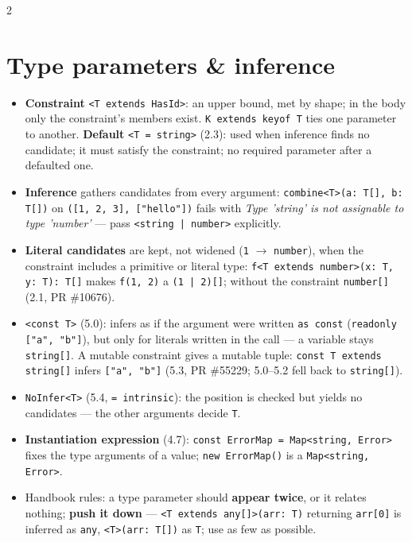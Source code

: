 \documentclass[8pt]{extarticle}
\newcommand\ct[1]{\texttt{#1}}
\begin{document}
\begin{multicols}{2}
\raggedright
\footnotesize{}

\section{Type parameters \& inference}
\begin{itemize}
  \item \textbf{Constraint} \ct{<T extends HasId>}: an upper bound, met by shape; in the body
        only the constraint's members exist. \ct{K extends keyof T} ties one parameter to
        another. \textbf{Default} \ct{<T = string>} (2.3): used when inference finds no
        candidate; it must satisfy the constraint; no required parameter after a defaulted one.
  \item \textbf{Inference} gathers candidates from every argument: \ct{combine<T>(a: T[], b: T[])}
        on \ct{([1, 2, 3], ["hello"])} fails with \emph{Type 'string' is not assignable to type
        'number'} — pass \ct{<string | number>} explicitly.
  \item \textbf{Literal candidates} are kept, not widened (\ct{1} $\to$ \ct{number}), when the
        constraint includes a primitive or literal type: \ct{f<T extends number>(x: T, y: T): T[]}
        makes \ct{f(1, 2)} a \ct{(1 | 2)[]}; without the constraint \ct{number[]} (2.1, PR \#10676).
  \item \ct{<const T>} (5.0): infers as if the argument were written \ct{as const}
        (\ct{readonly ["a", "b"]}), but only for literals written in the call — a variable
        stays \ct{string[]}. A mutable constraint gives a mutable tuple: \ct{const T extends
        string[]} infers \ct{["a", "b"]} (5.3, PR \#55229; 5.0–5.2 fell back to \ct{string[]}).
  \item \ct{NoInfer<T>} (5.4, \ct{= intrinsic}): the position is checked but yields no
        candidates — the other arguments decide \ct{T}.
  \item \textbf{Instantiation expression} (4.7): \ct{const ErrorMap = Map<string, Error>} fixes
        the type arguments of a value; \ct{new ErrorMap()} is a \ct{Map<string, Error>}.
  \item Handbook rules: a type parameter should \textbf{appear twice}, or it relates nothing;
        \textbf{push it down} — \ct{<T extends any[]>(arr: T)} returning \ct{arr[0]} is inferred
        as \ct{any}, \ct{<T>(arr: T[])} as \ct{T}; use as few as possible.
\end{itemize}


\end{multicols}
\end{document}
